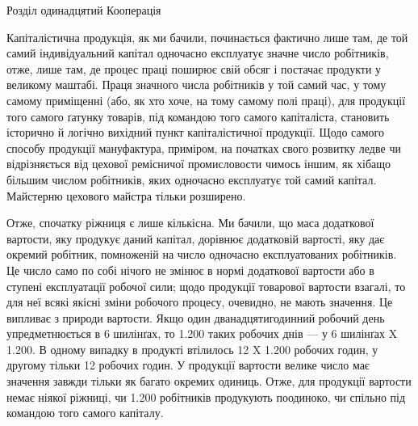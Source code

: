 Розділ одинадцятий
Кооперація

Капіталістична продукція, як ми бачили, починається фактично
лише там, де той самий індивідуальний капітал одночасно експлуатує значне число робітників, отже,
лише там, де процес праці
поширює свій обсяг і постачає продукти у великому маштабі.
Праця значного числа робітників у той самий час, у тому самому
приміщенні (або, як хто хоче, на тому самому полі праці), для продукції того самого ґатунку товарів,
під командою того самого
капіталіста, становить історично й логічно вихідний пункт капіталістичної продукції. Щодо самого
способу продукції мануфактура, приміром, на початках свого розвитку ледве чи відрізняється від
цехової ремісничої промисловости чимось іншим, як
хібащо більшим числом робітників, яких одночасно експлуатує
той самий капітал. Майстерню цехового майстра тільки розширено.

Отже, спочатку ріжниця є лише кількісна. Ми бачили, що
маса додаткової вартости, яку продукує даний капітал, дорівнює
додатковій вартості, яку дає окремий робітник, помноженій на
число одночасно експлуатованих робітників. Це число само по
собі нічого не змінює в нормі додаткової вартости або в ступені
експлуатації робочої сили; щодо продукції товарової вартости
взагалі, то для неї всякі якісні зміни робочого процесу, очевидно,
не мають значення. Це випливає з природи вартости. Якщо один
дванадцятигодинний робочий день упредметнюється в 6 шилінґах, то 1.200 таких робочих днів — у 6
шилінґах X 1.200. В одному випадку в продукті втілилось 12 X 1.200 робочих годин, у другому тільки
12 робочих годин. У продукції вартости велике число
має значення завжди тільки як багато окремих одиниць. Отже, для
продукції вартости немає ніякої ріжниці, чи 1.200 робітників продукують поодиноко, чи спільно під
командою того самого капіталу.

